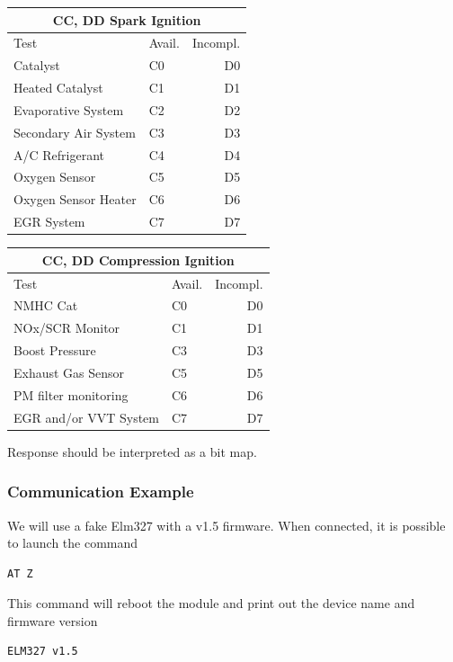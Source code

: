 \documentclass[twoside]{article}
\begin{document}
\begin{multicols}{2}
\begin{table}[H]
\centering
\begin{tabular}{llr}
\multicolumn{3}{c}{CC, DD Spark Ignition} \\
\toprule
Test & Avail. & Incompl. \\
\midrule
Catalyst & C0 & D0 \\
Heated Catalyst & C1 & D1 \\
Evaporative System & C2 & D2 \\
Secondary Air System & C3 & D3 \\
A/C Refrigerant & C4 & D4 \\
Oxygen Sensor & C5 & D5 \\
Oxygen Sensor Heater & C6 & D6 \\
EGR System & C7 & D7 \\
\bottomrule
\end{tabular}
\end{table}

\begin{table}[H]
\centering
\begin{tabular}{llr}
\multicolumn{3}{c}{CC, DD Compression Ignition} \\
\toprule
Test & Avail. & Incompl. \\
\midrule
NMHC Cat & C0 & D0 \\
NOx/SCR Monitor & C1 & D1 \\
Boost Pressure & C3 & D3 \\
Exhaust Gas Sensor & C5 & D5 \\
PM filter monitoring & C6 & D6 \\
EGR and/or VVT System & C7 & D7 \\
\bottomrule
\end{tabular}
\end{table}




Response should be interpreted as a bit map.

\subsubsection{Communication Example}
We will use a fake Elm327 with a v1.5 firmware.
When connected, it is possible to launch the command
\begin{lstlisting}[language=bash]
AT Z
\end{lstlisting}

This command will reboot the module and print out the device name and firmware version
\begin{lstlisting}[language=bash]
ELM327 v1.5
\end{lstlisting}


\end{multicols}
\end{document}
